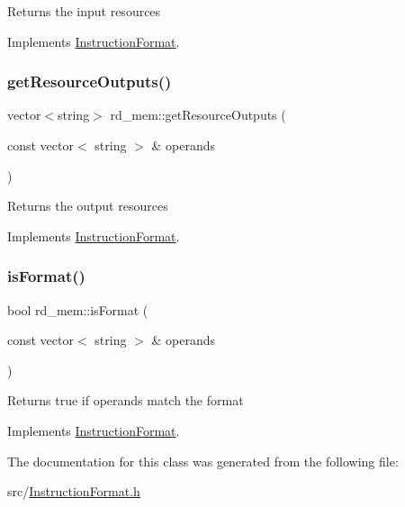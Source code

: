 Returns the input resources 

Implements \hyperlink{classInstructionFormat_a09775d3a3c22f40a0f44504664e586e4}{Instruction\+Format}.

\mbox{\label{classrd__mem_a84b92866d710443ed821459840541f53}} 
\subsubsection{\texorpdfstring{get\+Resource\+Outputs()}{getResourceOutputs()}}
{\footnotesize\ttfamily vector$<$string$>$ rd\+\_\+mem\+::get\+Resource\+Outputs (\begin{DoxyParamCaption}\item[{const vector$<$ string $>$ \&}]{operands }\end{DoxyParamCaption})\hspace{0.3cm}{\ttfamily [virtual]}}

Returns the output resources 

Implements \hyperlink{classInstructionFormat_a95cd28ffb1bde59b67f676880ab10536}{Instruction\+Format}.

\mbox{\label{classrd__mem_a1326e4c5e3a7f263d5dc850b0d32962f}} 
\subsubsection{\texorpdfstring{is\+Format()}{isFormat()}}
{\footnotesize\ttfamily bool rd\+\_\+mem\+::is\+Format (\begin{DoxyParamCaption}\item[{const vector$<$ string $>$ \&}]{operands }\end{DoxyParamCaption})\hspace{0.3cm}{\ttfamily [virtual]}}

Returns true if operands match the format 

Implements \hyperlink{classInstructionFormat_a9fdcf94dcd7d9a55ba86e7a63f04d1fe}{Instruction\+Format}.



The documentation for this class was generated from the following file\+:\begin{DoxyCompactItemize}
\item 
src/\hyperlink{InstructionFormat_8h}{Instruction\+Format.\+h}\end{DoxyCompactItemize}
